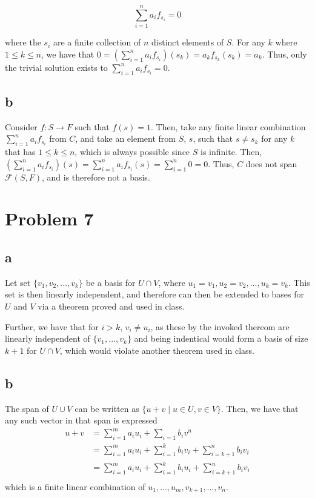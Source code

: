 \documentclass[12pt,letterpaper]{article}
\theoremstyle{definition}
\begin{document}
\[
  \sum_{i=1}^na_if_{s_i} = 0
\]

where the $s_i$ are a finite collection of $n$ distinct elements of $S$. For
any $k$ where $1 \leq k \leq n$, we have that $0 = (\sum_{i=1}^na_if_{s_i})(s_k) =
a_kf_{s_k}(s_k) = a_k$. Thus, only the trivial solution exists to
$\sum_{i=1}^na_if_{s_i} = 0$. 

\subsection*{b}

Consider $f: S \rightarrow F$ such that $f(s) = 1$. Then, take any finite linear
combination $\sum_{i=1}^na_if_{s_i}$ from $C$, and take an element from $S$, $s$,
such that $s \neq s_k$ for any $k$ that has $1 \leq k \leq n$, which is always
possible since $S$ is infinite. Then, $(\sum_{i=1}^na_if_{s_i})(s) =
\sum_{i=1}^na_if_{s_i}(s) = \sum_{i=1}^n 0 = 0$. Thus, $C$ does not span
$\mathcal{F}(S, F)$, and is therefore not a basis.


\section*{Problem 7}

\subsection*{a}

Let set $\{v_1, v_2, ..., v_k\}$ be a basis for $U \cap V$, where $u_1 = v_1,
u_2 = v_2, ..., u_k = v_k$. This set is then linearly independent, and therefore
can then be extended to bases for $U$ and $V$ via a theorem proved and used in
class.

Further, we have that for $i > k$, $v_i \neq u_i$, as these by the invoked
thereom are linearly independent of $\{v_1, ..., v_k\}$ and being indentical
would form a basis of size $k + 1$ for $U \cap V$, which would violate another
theorem used in class.

\subsection*{b}

The span of $U \cup V$ can be written as $\{u + v \mid u \in U, v \in V\}$.
Then, we have that any such vector in that span is expressed
\begin{align*}
  u + v &= \sum_{i=1}^ma_iu_i + \sum_{i=1}b_iv^n \\
        &= \sum_{i=1}^ma_iu_i + \sum_{i=1}^kb_iv_i + \sum_{i=k+1}^nb_iv_i \\
        &= \sum_{i=1}^ma_iu_i + \sum_{i=1}^kb_iu_i + \sum_{i=k+1}^nb_iv_i \\
\end{align*}
which is a finite linear combination of $u_1, ..., u_m, v_{k+1}, ..., v_{n}$.
\end{document}
